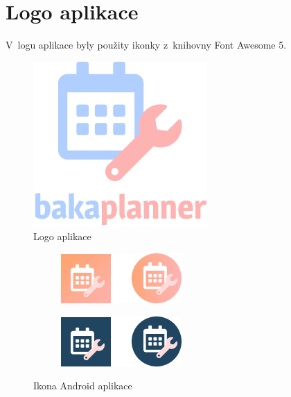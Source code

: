 \documentclass[twoside]{ctuthesis}
\begin{document}
\section{Logo aplikace}

V~logu aplikace byly použity ikonky z~knihovny Font Awesome 5.

\begin{figure}[h!]
	\includegraphics[scale=.5]{img/logo.png}
	\caption{Logo aplikace}
	\label{fig:logo}
\end{figure}

\begin{figure}[h]
	\centering
	\begin{subfigure}{.5\textwidth}
		\centering
		\includegraphics[width=.7\linewidth]{img/launcher-prod.png}
		\label{launcher-prod}
	\end{subfigure}%
	\begin{subfigure}[h!]{.5\textwidth}
		\centering
		\includegraphics[width=.7\linewidth]{img/launcher-debug.png}
		\label{launcher-debug}
	\end{subfigure}
	\caption{Ikona Android aplikace}
\end{figure}
\end{document}
